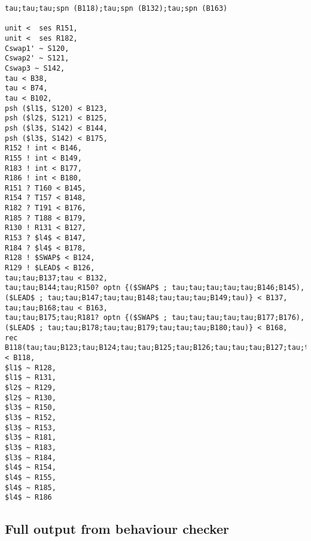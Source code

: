 \begin{lstlisting}
tau;tau;tau;spn (B118);tau;spn (B132);tau;spn (B163)

unit <  ses R151,
unit <  ses R182,
Cswap1' ~ S120,
Cswap2' ~ S121,
Cswap3 ~ S142,
tau < B38,
tau < B74,
tau < B102,
psh ($l1$, S120) < B123,
psh ($l2$, S121) < B125,
psh ($l3$, S142) < B144,
psh ($l3$, S142) < B175,
R152 ! int < B146,
R155 ! int < B149,
R183 ! int < B177,
R186 ! int < B180,
R151 ? T160 < B145,
R154 ? T157 < B148,
R182 ? T191 < B176,
R185 ? T188 < B179,
R130 ! R131 < B127,
R153 ? $l4$ < B147,
R184 ? $l4$ < B178,
R128 ! $SWAP$ < B124,
R129 ! $LEAD$ < B126,
tau;tau;B137;tau < B132,
tau;tau;B144;tau;R150? optn {($SWAP$ ; tau;tau;tau;tau;tau;B146;B145), ($LEAD$ ; tau;tau;B147;tau;tau;B148;tau;tau;tau;B149;tau)} < B137,
tau;tau;B168;tau < B163,
tau;tau;B175;tau;R181? optn {($SWAP$ ; tau;tau;tau;tau;tau;B177;B176), ($LEAD$ ; tau;tau;B178;tau;tau;B179;tau;tau;tau;B180;tau)} < B168,
rec B118(tau;tau;B123;tau;B124;tau;tau;B125;tau;B126;tau;tau;tau;B127;tau;tau;B118) < B118,
$l1$ ~ R128,
$l1$ ~ R131,
$l2$ ~ R129,
$l2$ ~ R130,
$l3$ ~ R150,
$l3$ ~ R152,
$l3$ ~ R153,
$l3$ ~ R181,
$l3$ ~ R183,
$l3$ ~ R184,
$l4$ ~ R154,
$l4$ ~ R155,
$l4$ ~ R185,
$l4$ ~ R186
\end{lstlisting}

\subsection*{Full output from behaviour checker}

